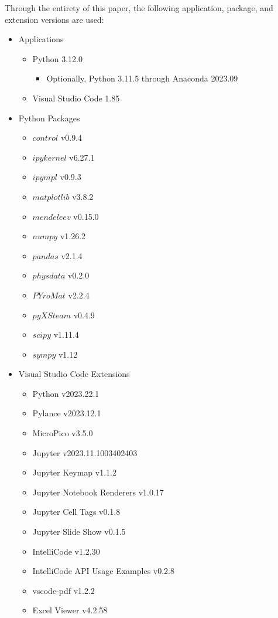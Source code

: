 Through the entirety of this paper, the following application, package, and extension versions are used:

\begin{itemize}
    \item Applications
    \begin{itemize}
        \item Python 3.12.0
            \begin{itemize}
                \item Optionally, Python 3.11.5 through Anaconda 2023.09
            \end{itemize}
        \item Visual Studio Code 1.85
    \end{itemize}
    \item Python Packages
    \begin{itemize}
        \item $control$ v0.9.4
        \item $ipykernel$ v6.27.1
        \item $ipympl$ v0.9.3
        \item $matplotlib$ v3.8.2
        \item $mendeleev$ v0.15.0
        \item $numpy$ v1.26.2
        \item $pandas$ v2.1.4
        \item $physdata$ v0.2.0
        \item $PYroMat$ v2.2.4
        \item $pyXSteam$ v0.4.9
        \item $scipy$ v1.11.4
        \item $sympy$ v1.12
    \end{itemize}
    \item Visual Studio Code Extensions
    \begin{itemize}
        \item Python v2023.22.1
        \item Pylance v2023.12.1
        \item MicroPico v3.5.0
        \item Jupyter v2023.11.1003402403
        \item Jupyter Keymap v1.1.2
        \item Jupyter Notebook Renderers v1.0.17 
        \item Jupyter Cell Tags v0.1.8
        \item Jupyter Slide Show v0.1.5
        \item IntelliCode v1.2.30
        \item IntelliCode API Usage Examples v0.2.8
        \item vscode-pdf v1.2.2
        \item Excel Viewer v4.2.58
    \end{itemize}
\end{itemize}